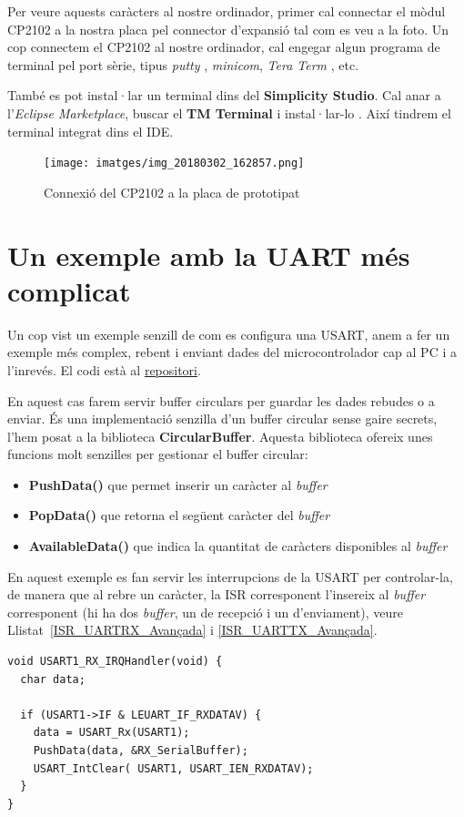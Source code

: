 Per veure aquests caràcters al nostre ordinador, primer cal connectar el mòdul CP2102 a la nostra placa pel connector d'expansió tal com es veu a la foto. Un cop connectem el CP2102 al nostre ordinador, cal engegar algun programa de terminal pel port sèrie, tipus {\em putty} \cite{putty}, {\em minicom}, {\em Tera Term} \cite{teraterm}, etc.

\begin{remark}
 També es pot instal·lar un terminal dins del {\bf Simplicity Studio}. Cal anar a l'{\em Eclipse Marketplace}, buscar el {\bf TM Terminal} i instal·lar-lo \cite{tmterminal}. Així tindrem el terminal integrat dins el IDE.
\end{remark}

\begin{figure}
 \centering
 \texttt{[image: imatges/img\_20180302\_162857.png]}
 \caption{Connexió del CP2102 a la placa de prototipat}
 \label{fig:CP2102}
\end{figure}


\section{Un exemple amb la UART més complicat}
\label{sec:UART_example_2}
Un cop vist un exemple senzill de com es configura una USART, anem a fer un exemple més complex, rebent i enviant dades del microcontrolador cap al PC i a l'inrevés. El codi està al \href{https://github.com/mariusmm/cursembedded/tree/master/Simplicity/UART_2}{repositori}.

En aquest cas farem servir \glspl{buffer circular} per guardar les dades rebudes o a enviar.  És una implementació senzilla d'un buffer circular sense gaire secrets, l'hem posat a la biblioteca {\bf CircularBuffer}. Aquesta biblioteca ofereix unes funcions molt senzilles per gestionar el buffer circular:
\begin{itemize}
 \item {\bf PushData()} que permet inserir un caràcter al {\em buffer}
 \item {\bf PopData()} que retorna el següent caràcter del {\em buffer}
 \item {\bf AvailableData()} que indica la quantitat de caràcters disponibles al {\em buffer}
\end{itemize}

En aquest exemple es fan servir les interrupcions de la USART per controlar-la, de manera que al rebre un caràcter, la \gls{ISR} corresponent l'insereix al {\em buffer} corresponent (hi ha dos {\em buffer}, un de recepció i un d'enviament), veure Llistat~\ref{ISR_UARTRX_Avançada} i \ref{ISR_UARTTX_Avançada}.
\begin{lstlisting}[style=customc,label=ISR_UARTRX_Avançada,caption=Exemple ISR avançada]
void USART1_RX_IRQHandler(void) {
  char data;

  if (USART1->IF & LEUART_IF_RXDATAV) {
    data = USART_Rx(USART1);
    PushData(data, &RX_SerialBuffer);
    USART_IntClear( USART1, USART_IEN_RXDATAV);
  }
}
\end{lstlisting}

